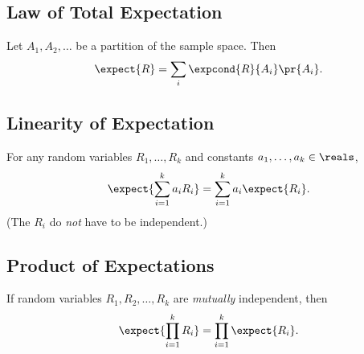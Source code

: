 \documentclass[handout]{mcs}
\begin{document}
\subsection{Law of Total Expectation}
Let $A_1,A_2,\dots$ be a partition of the sample space.  Then
\[
\expect{R} = \sum_i \expcond{R}{A_i} \pr{A_i}.
\]

\subsection{Linearity of Expectation}
For any random variables $R_1, \dots, R_k$ and constants $a_1, \dots, a_k
\in \reals$,
\[
\expect{\sum_{i=1}^k a_iR_i} = \sum_{i=1}^k a_i\expect{R_i}.
\]
(The $R_i$ do \emph{not} have to be independent.)

\subsection{Product of Expectations} If random
variables $R_1, R_2, \dots, R_k$ are \emph{mutually} independent, then
\[
\expect{\prod_{i=1}^k R_i} = \prod_{i=1}^k \expect{R_i}.
\]
\end{document}
